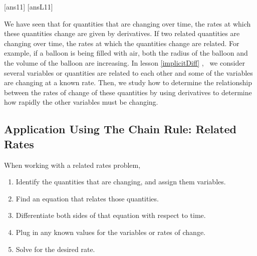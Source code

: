 

\newpage
[ans11]
[ansL11]

\noindent We have seen that for quantities that are changing over time, the rates at which these quantities change are given by derivatives. If two related quantities are changing over time, the rates at which the quantities change are related. For example, if a balloon is being filled with air, both the radius of the balloon and the volume of the balloon are increasing. In lesson \ref{implicitDiff} ,  we consider several variables or quantities are related to each other and some of the variables are changing at a known rate. Then, we study how to determine the relationship between the rates of change of these quantities by using derivatives to determine how rapidly the other variables must be changing.

\subsection*{Application Using The Chain Rule: Related Rates}
\begin{tcolorbox}[title = {Strategy for Finding Related Rates}]
When working with a related rates problem,
\begin{enumerate}
    \item Identify the quantities that are changing, and assign them variables.
    \item Find an equation that relates those quantities.
    \item Differentiate both sides of that equation with respect to time.
    \item Plug in any known values for the variables or rates of change.
    \item Solve for the desired rate.
\end{enumerate}
\end{tcolorbox}


